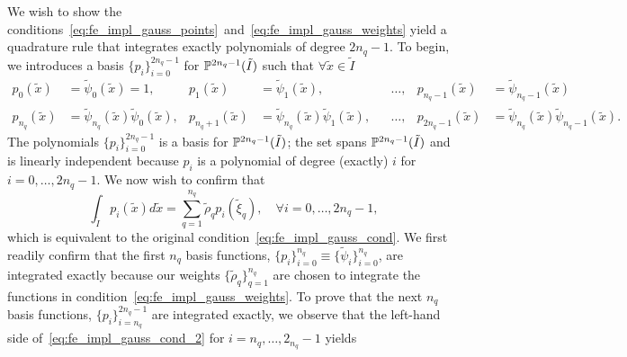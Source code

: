 We wish to show the conditions~\eqref{eq:fe_impl_gauss_points}~and~\eqref{eq:fe_impl_gauss_weights} yield a quadrature rule that integrates exactly polynomials of degree $2n_q-1$. To begin, we introduces a basis $\{p_i\}_{i=0}^{2n_q-1}$ for $\mathbb{P}^{2n_q-1}(\tilde I)$ such that $\forall \tilde x \in \tilde I$
\begin{align*}
  p_0(\tilde x) &= \tilde \psi_0(\tilde x) = 1, &
  p_1(\tilde x) &= \tilde \psi_1(\tilde x), &
  &\dots, &
  p_{n_q-1}(\tilde x) &= \tilde \psi_{n_q-1}(\tilde x) \\
  p_{n_q}(\tilde x) &= \tilde \psi_{n_q}(\tilde x) \tilde \psi_0(\tilde x), & 
  p_{n_q+1}(\tilde x) &= \tilde \psi_{n_q}(\tilde x) \tilde \psi_1(\tilde x), &  
  &\dots, &
  p_{2n_q-1}(\tilde x) &= \tilde \psi_{n_q}(\tilde x) \tilde \psi_{n_q-1}(\tilde x) .
\end{align*}
The polynomials $\{ p_i \}_{i=0}^{2n_q - 1}$ is a basis for $\mathbb{P}^{2n_q - 1}(\tilde I)$; the set spans $\mathbb{P}^{2n_q-1}(\tilde I)$ and is linearly independent because $p_i$ is a polynomial of degree (exactly) $i$ for $i = 0,\dots,2 n_q - 1$.
We now wish to confirm that
\begin{equation}
  \int_{\tilde I} p_i(\tilde x) d\tilde x = \sum_{q=1}^{n_q} \tilde \rho_q p_i(\tilde \xi_q), \quad \forall i = 0,\dots,2 n_q - 1,
  \label{eq:fe_impl_gauss_cond_2}
\end{equation}
which is equivalent to the original condition~\eqref{eq:fe_impl_gauss_cond}. We first readily confirm that the first $n_q$ basis functions, $\{p_i\}_{i=0}^{n_q} \equiv \{ \tilde \psi_i \}_{i=0}^{n_q}$, are integrated exactly because our weights $\{ \tilde \rho_q \}_{q=1}^{n_q}$ are chosen to integrate the functions in condition~\eqref{eq:fe_impl_gauss_weights}. 
To prove that the next $n_q$ basis functions, $\{ p_i \}_{i=n_q}^{2n_q-1}$ are integrated exactly, we observe that the left-hand side of~\ref{eq:fe_impl_gauss_cond_2} for $i = n_q,\dots,2_{n_q}-1$ yields 
